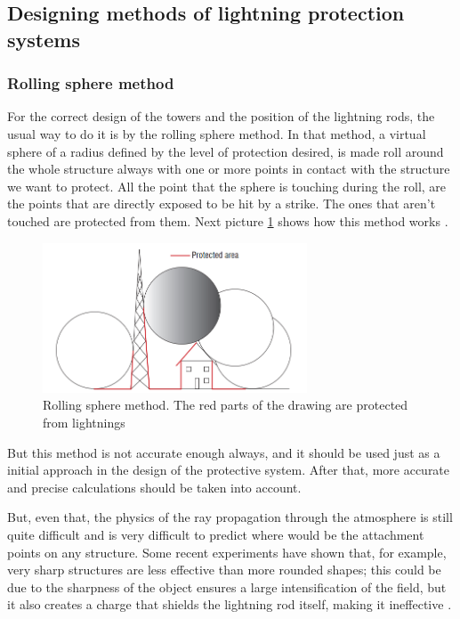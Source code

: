 \subsection{Designing methods of lightning protection systems}
\subsubsection{Rolling sphere method}

For the correct design of the towers and the position of the lightning rods, the
usual way to do it is by the rolling sphere method. In that method, a virtual
sphere of a radius defined by the level of protection desired, is made roll around
the whole structure always with one or more points in contact with the
structure we want to protect. All the point that the sphere is touching during the
roll, are the points that are directly exposed to be hit by a strike. The ones that
aren't touched are protected from them. Next picture \ref{fig:rsm} shows how this
method works \cite{2012Issac}.

\begin{figure}[h!]
	\centering
	\includegraphics[width=0.7\textwidth]{img/Rolling_sphere_method.png}
	\caption{Rolling sphere method. The red parts of the drawing are protected from lightnings}
	\label{fig:rsm}
\end{figure}

But this method is not accurate enough always, and it should be used just as a
initial approach in the design of the protective system. After that, more accurate
and precise calculations should be taken into account.

But, even that, the physics of the ray propagation through the atmosphere is still
quite difficult and is very difficult to predict where would be the attachment
points on any structure. Some recent experiments have shown that, for example,
very sharp structures are less effective than more rounded shapes;
this could be due to the sharpness of the object ensures a large intensification of the
field, but it also creates a charge that shields the lightning rod itself, making it
ineffective \cite{2004RISON}.

